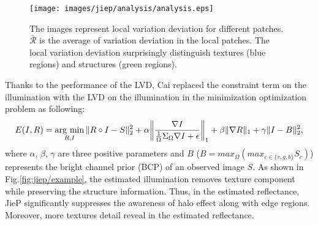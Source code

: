 \begin{figure}[tb]
	\centering
	\texttt{[image: images/jiep/analysis/analysis.eps]}
	\caption{The images represent local variation deviation for different patches. $\bar{\mathcal{R}}$ is the average of variation deviation in the local patches. The local variation deviation surprisingly distinguish textures (blue regions) and structures (green regions).
	} \label{fig:jiep/analysis}
\end{figure}

Thanks to the performance of the LVD, Cai replaced the constraint term on the illumination with the LVD on the illumination in the minimization optimization problem as following:
\begin{equation}
 E(I, R) = \mathop{\rm arg~min}\limits_{R, I} \|R \circ I - S\|_{2}^{2} + \alpha{\left \|\frac{\nabla{I}}{\frac{1}{\Omega}\Sigma_{\Omega}\nabla{I} + \epsilon} \right\|_{1}} + \beta{\|\nabla{R}\|_{1}} + \gamma{\|I - B\|_{2}^{2}}, \label{eq:jiep}
\end{equation}
where $\alpha$, $\beta$, $\gamma$ are three positive parameters and $B$ ($B = max_{\Omega}(max_{c \in \{r, g, b\}}S_{c})$) represents the bright channel prior (BCP) of an observed image $S$. As shown in Fig.\ref{fig:jiep/example}, the estimated illumination removes texture component while preserving the structure information. Thus, in the estimated reflectance, JieP significantly suppresses the awareness of halo effect along with edge regions. Moreover, more textures detail reveal in the estimated reflectance.

